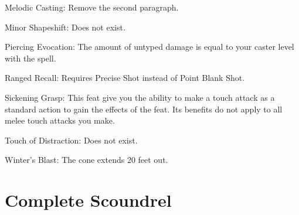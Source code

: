\begin{itemize*}
\item Melodic Casting: Remove the second paragraph.
\item Minor Shapeshift: Does not exist.
\item Piercing Evocation: The amount of untyped damage is equal to your caster level with the spell.
\item Ranged Recall: Requires Precise Shot instead of Point Blank Shot.
\item Sickening Grasp: This feat give you the ability to make a touch attack as a standard action to gain the effects of the feat. Its benefits do not apply to all melee touch attacks you make.
\item Touch of Distraction: Does not exist.
\item Winter's Blast: The cone extends 20 feet out.
\end{itemize*}

\section{Complete Scoundrel}
